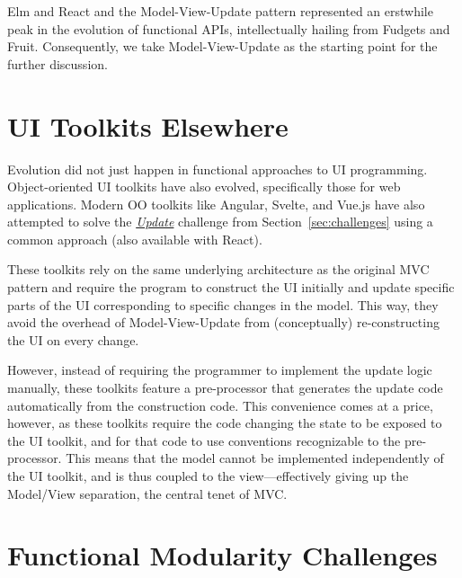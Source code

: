\documentclass[sigplan,screen]{acmart}
\begin{document}

Elm and React and the Model-View-Update pattern represented an
erstwhile peak in the evolution of functional APIs, intellectually
hailing from Fudgets and Fruit.  Consequently, we take
Model-View-Update as the starting point for the further discussion.

\section{UI Toolkits Elsewhere}
\label{sec:ui-toolkits-elsewhere}

Evolution did not just happen in functional approaches to UI
programming.  Object-oriented UI toolkits have also evolved,
specifically those for web applications.  Modern OO toolkits like
Angular, Svelte, and Vue.js have also attempted to solve the \hyperlink{challenge:update}{\textit{Update}} challenge
from Section~\ref{sec:challenges} using a common approach (also
available with React).

These toolkits rely on the same underlying architecture as the
original MVC pattern and require the program to construct the UI
initially and update specific parts of the UI corresponding to
specific changes in the model.  This way, they avoid the overhead of
Model-View-Update from (conceptually) re-constructing the UI on every
change.

However, instead of requiring the programmer to implement the update
logic manually, these toolkits feature a pre-processor 
that generates the update code automatically from the construction code.
This convenience comes at a price, however, as these toolkits require
the code changing the state to be exposed to the UI toolkit, and for
that code to use conventions recognizable to the pre-processor.  This
means that the model cannot be implemented independently of the UI
toolkit, and is thus coupled to the view---effectively giving up the
Model/View separation, the central tenet of MVC.

\section{Functional Modularity Challenges}
\label{sec:modularity-challenges}
\end{document}
